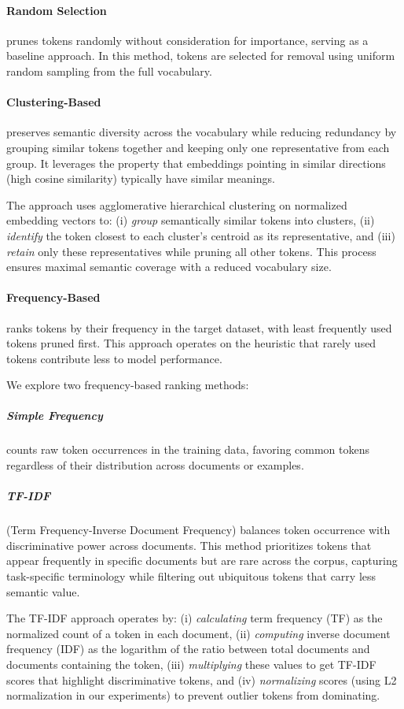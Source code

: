\documentclass[twocolumn]{article}
\begin{document}
\paragraph{Random Selection}
prunes tokens randomly without consideration for importance, serving as a baseline approach. In this method, tokens are selected for removal using uniform random sampling from the full vocabulary.

\paragraph{Clustering-Based}
preserves semantic diversity across the vocabulary while reducing redundancy by grouping similar tokens together and keeping only one representative from each group. It leverages the property that embeddings pointing in similar directions (high cosine similarity) typically have similar meanings.

The approach uses agglomerative hierarchical clustering on normalized embedding vectors to: 
(i) \textit{group} semantically similar tokens into clusters, 
(ii) \textit{identify} the token closest to each cluster's centroid as its representative, and
(iii) \textit{retain} only these representatives while pruning all other tokens.
This process ensures maximal semantic coverage with a reduced vocabulary size.

\paragraph{Frequency-Based}
ranks tokens by their frequency in the target dataset, with least frequently used tokens pruned first. This approach operates on the heuristic that rarely used tokens contribute less to model performance.

We explore two frequency-based ranking methods:

\subparagraph{Simple Frequency} counts raw token occurrences in the training data, favoring common tokens regardless of their distribution across documents or examples.

\subparagraph{TF-IDF} (Term Frequency-Inverse Document Frequency) balances token occurrence with discriminative power across documents. This method prioritizes tokens that appear frequently in specific documents but are rare across the corpus, capturing task-specific terminology while filtering out ubiquitous tokens that carry less semantic value.

The TF-IDF approach operates by:
(i) \textit{calculating} term frequency (TF) as the normalized count of a token in each document,
(ii) \textit{computing} inverse document frequency (IDF) as the logarithm of the ratio between total documents and documents containing the token,
(iii) \textit{multiplying} these values to get TF-IDF scores that highlight discriminative tokens, and
(iv) \textit{normalizing} scores (using L2 normalization in our experiments) to prevent outlier tokens from dominating.
\end{document}
